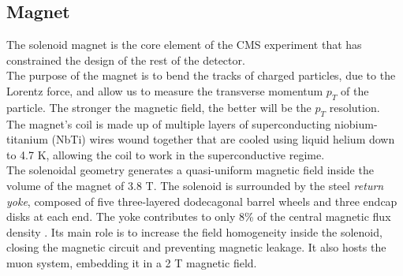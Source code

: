 \subsection{Magnet}
The solenoid magnet \cite{Coroller1997TheReport} is the core element of the CMS experiment that has constrained the design of the rest of the detector.\\
The purpose of the magnet is to bend the tracks of charged particles, due to the Lorentz force, and allow us to measure the transverse momentum $p_T$ of the particle. The stronger the magnetic field, the better will be the $p_T$ resolution.\\
The magnet's coil is made up of multiple layers of superconducting niobium-titanium (NbTi) wires wound together that are cooled using liquid helium down to 4.7 K, allowing the coil to work in the superconductive regime.\\
The solenoidal geometry generates a quasi-uniform magnetic field inside the volume of the magnet of 3.8 T.
The solenoid is surrounded by the steel \emph{return yoke}, composed of five three-layered dodecagonal barrel wheels and three endcap disks at each end.  The yoke contributes to only 8\% of the central magnetic flux density \cite{Chatrchyan2010PreciseRays}. Its main role is to increase the field homogeneity inside the solenoid, closing the magnetic circuit and preventing magnetic leakage. It also hosts the muon system, embedding it in a 2 T magnetic field.

